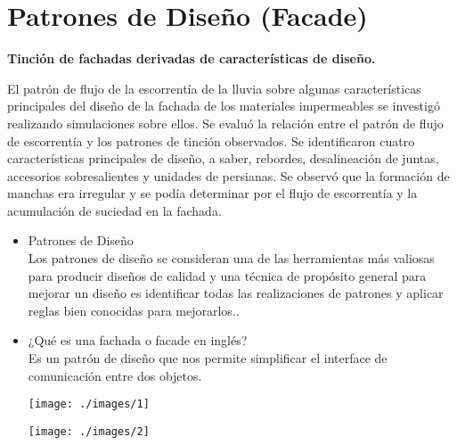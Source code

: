 \section{Patrones de Diseño (Facade)} 
\textbf{Tinción de fachadas derivadas de características de diseño.}\\
\begin{flushleft}
El patrón de flujo de la escorrentía de la lluvia sobre algunas características principales del diseño de la fachada de los materiales impermeables se investigó realizando simulaciones sobre ellos. Se evaluó la relación entre el patrón de flujo de escorrentía y los patrones de tinción observados. Se identificaron cuatro características principales de diseño, a saber, rebordes, desalineación de juntas, accesorios sobresalientes y unidades de persianas. Se observó que la formación de manchas era irregular y se podía determinar por el flujo de escorrentía y la acumulación de suciedad en la fachada.

\begin{itemize}
	\item Patrones de Diseño
	\\Los patrones de diseño se consideran una de las herramientas más valiosas para producir diseños de calidad y una técnica de propósito general para mejorar un diseño es identificar todas las realizaciones de patrones y aplicar reglas bien conocidas para mejorarlos..


	


	\item ¿Qué es una fachada o facade en inglés?
	\\ Es un patrón de diseño que nos permite simplificar el interface de comunicación entre dos objetos.
	\begin{center}
	\texttt{[image: ./images/1]} 
	\end{center}

	
	\begin{center}
	\texttt{[image: ./images/2]} 
	\end{center}

	

\end{itemize} 


\end{flushleft}